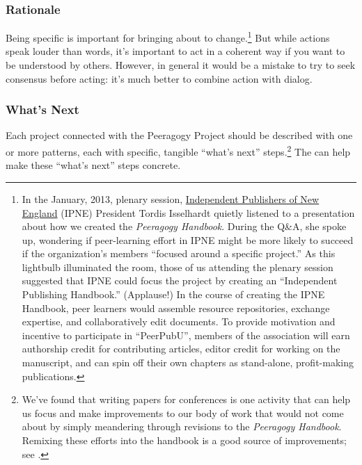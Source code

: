 \subsubsection*{Rationale} 
Being specific is important for bringing about to change.\footnote{In the January, 2013, plenary
session, \href{http://ipne.org}{Independent Publishers of New England}
(IPNE) President Tordis Isselhardt quietly listened to a presentation
about how we created the \emph{Peeragogy Handbook}. During the Q\&A, she
spoke up, wondering if peer-learning effort in IPNE might be more likely
to succeed if the organization's members ``focused around a specific
project.'' As this lightbulb illuminated the room, those of us attending
the plenary session suggested that IPNE could focus the project by
creating an ``Independent Publishing Handbook.'' (Applause!) In the
course of creating the IPNE Handbook, peer learners would assemble
resource repositories, exchange expertise, and collaboratively edit
documents. To provide motivation and incentive to participate in
``PeerPubU'', members of the association will earn authorship credit for
contributing articles, editor credit for working on the manuscript, and
can spin off their own chapters as stand-alone, profit-making
publications.} But while actions speak louder than words, it's important
to act in a coherent way if you want to be understood by others.  However, in
general it would be a mistake to try to seek consensus before acting: it's much better to combine action with dialog.

\subsubsection*{What's Next}  Each project connected with the Peeragogy Project should be described with one or more patterns, each with specific, tangible ``what's next'' steps.\footnote{We've found that writing papers for conferences is one activity that can help us focus and make improvements to our body of work that would not come about by simply meandering through revisions to the \emph{Peeragogy Handbook}.  Remixing these efforts into the handbook is a good source of improvements; see .}  The  can help make these ``what's next'' steps concrete. 

